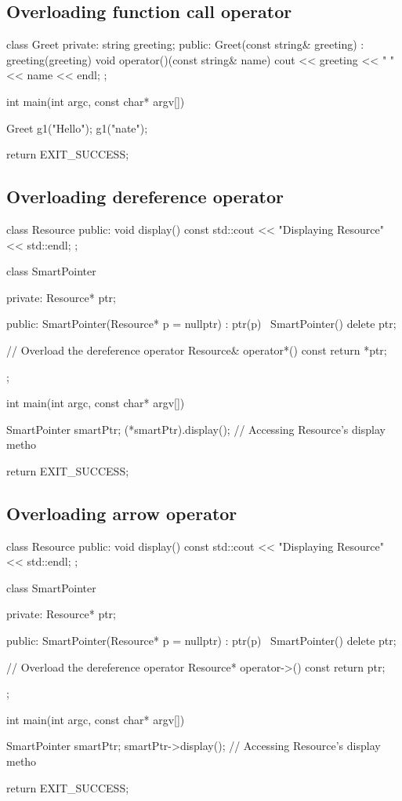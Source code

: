 \documentclass{report}
\begin{document}
    \bigbreak \noindent 
    \subsection{Overloading function call operator}
    \bigbreak \noindent 
    \begin{cppcode}
class Greet {
private:
    string greeting; 
public:
    Greet(const string& greeting) : greeting(greeting) {}
    void operator()(const string& name) {
        cout << greeting << " " << name << endl;
    }
};

int main(int argc, const char* argv[]) {
    Greet g1("Hello");
    g1("nate");

    return EXIT_SUCCESS;
}
    \end{cppcode}

    \pagebreak \bigbreak \noindent 
    \subsection{Overloading dereference operator}
    \bigbreak \noindent 
    \begin{cppcode}
class Resource {
public:
    void display() const { std::cout << "Displaying Resource" << std::endl; }
};

class SmartPointer {
private:
    Resource* ptr;

public:
    SmartPointer(Resource* p = nullptr) : ptr(p) {}
    ~SmartPointer() { delete ptr; }

    // Overload the dereference operator
    Resource& operator*() const { return *ptr; }
};

int main(int argc, const char* argv[]) {
     SmartPointer smartPtr;
    (*smartPtr).display();  // Accessing Resource's display metho
    
    return EXIT_SUCCESS;
}
    \end{cppcode}
    \bigbreak \noindent 
    \subsection{Overloading arrow operator}
    \bigbreak \noindent 
    \begin{cppcode}
class Resource {
public:
    void display() const { std::cout << "Displaying Resource" << std::endl; }
};

class SmartPointer {
private:
    Resource* ptr;

public:
    SmartPointer(Resource* p = nullptr) : ptr(p) {}
    ~SmartPointer() { delete ptr; }

    // Overload the dereference operator
    Resource* operator->() const { return ptr; }
};

int main(int argc, const char* argv[]) {
     SmartPointer smartPtr;
    smartPtr->display();  // Accessing Resource's display metho
    
    return EXIT_SUCCESS;
}
    \end{cppcode}
\end{document}
